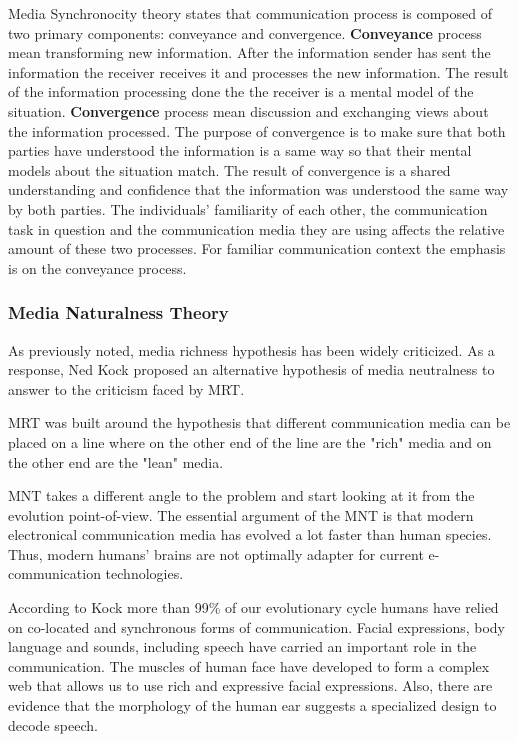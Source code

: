 \documentclass[english,12pt,a4paper,pdftex]{article}
\begin{document}
Media Synchronocity theory states that communication process is composed of two primary components: conveyance and convergence. \textbf{Conveyance} process mean transforming new information. After the information sender has sent the information the receiver receives it and processes the new information. The result of the information processing done the the receiver is a mental model of the situation. \textbf{Convergence} process mean discussion and exchanging views about the information processed. The purpose of convergence is to make sure that both parties have understood the information is a same way so that their mental models about the situation match. The result of convergence is a shared understanding and confidence that the information was understood the same way by both parties. The individuals' familiarity of each other, the communication task in question and the communication media they are using affects the relative amount of these two processes. For familiar communication context the emphasis is on the conveyance process. \citep{dennis2008}

\subsubsection{Media Naturalness Theory}

As previously noted, media richness hypothesis has been widely criticized. As a response, Ned Kock proposed an alternative hypothesis of media neutralness to answer to the criticism faced by \ac{MRT}.

\ac{MRT} was built around the hypothesis that different communication media can be placed on a line where on the other end of the line are the "rich" media and on the other end are the "lean" media. \citep{daft1986}

\Ac{MNT} takes a different angle to the problem and start looking at it from the evolution point-of-view. The essential argument of the \ac{MNT} is that modern electronical communication media has evolved a lot faster than human species. Thus, modern humans' brains are not optimally adapter for current e-communication technologies. \citep{kock2005}

According to Kock more than 99\% of our evolutionary cycle humans have relied on co-located and synchronous forms of communication. Facial expressions, body language and sounds, including speech have carried an important role in the communication. The muscles of human face have developed to form a complex web that allows us to use rich and expressive facial expressions. Also, there are evidence that the morphology of the human ear suggests a specialized design to decode speech. \citep{kock2005}
\end{document}
